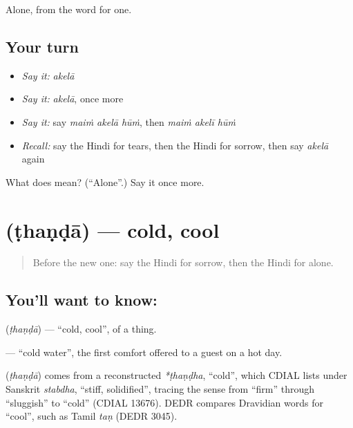 \begin{grammarlens}[title={What you've built}]
Alone, from the word for one.
\end{grammarlens}

\subsection*{Your turn}
\begin{itemize}
\raggedright
  \item \emph{Say it:} \emph{akelā}
  \item \emph{Say it:} \emph{akelā}, once more
  \item \emph{Say it:} say \emph{maiṁ akelā hūṁ}, then \emph{maiṁ akelī hūṁ}
  \item \emph{Recall:} say the Hindi for tears, then the Hindi for sorrow, then say \emph{akelā} again
\end{itemize}

\begin{tcolorbox}[breakable,colback=teal!4,colframe=teal!35!black,title={Before you move on}]
What does  mean? (\textquotedblleft{}Alone\textquotedblright{}.) Say it once more.
\end{tcolorbox}
\section[\texorpdfstring{\hi{ठंडा} (ṭhaṇḍā)}{ठंडा (ṭhaṇḍā)}]{ (ṭhaṇḍā) — cold, cool}

\label{lesson:HI-C109-thanda}



\begin{quote}
Before the new one: say the Hindi for sorrow, then the Hindi for alone.
\end{quote}

\subsection*{You'll want to know: }
\textbf{} (\emph{ṭhaṇḍā}) — \textquotedblleft{}cold, cool\textquotedblright{}, of a thing.

\textbf{ } — \textquotedblleft{}cold water\textquotedblright{}, the first comfort offered to a guest on a hot day.

\begin{cousinweb}
\textbf{} (\emph{ṭhaṇḍā}) comes from a reconstructed \emph{*ṭhaṇḍha}, \textquotedblleft{}cold\textquotedblright{}, which CDIAL lists under Sanskrit \emph{stabdha}, \textquotedblleft{}stiff, solidified\textquotedblright{}, tracing the sense from \textquotedblleft{}firm\textquotedblright{} through \textquotedblleft{}sluggish\textquotedblright{} to \textquotedblleft{}cold\textquotedblright{} (CDIAL 13676). DEDR compares Dravidian words for \textquotedblleft{}cool\textquotedblright{}, such as Tamil \emph{taṇ} (DEDR 3045).
\end{cousinweb}

